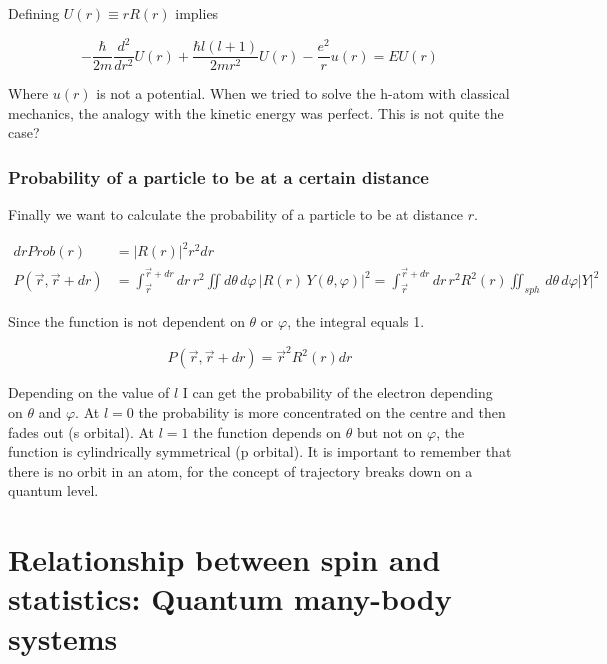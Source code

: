 		Defining $U(r) \equiv rR(r)$ implies

		$$-\frac{\hbar}{2m} \frac{d^2}{dr^2} U(r) + \frac{\hbar l(l+1)}{2mr^2} U(r) - \frac{e^2}{r} u(r) = E U(r)$$

		Where $u(r)$ is not a potential.
		When we tried to solve the h-atom with classical mechanics, the analogy with the kinetic energy was perfect.
		This is not quite the case?

		\subsubsection{Probability of a particle to be at a certain distance}
		Finally we want to calculate the probability of a particle to be at distance $r$.

		\begin{align*}
			drProb(r)&=|R(r)|^2r^2dr\\
			P(\vec{r},\vec{r}+dr)&=\int_{\vec{r}}^{\vec{r}+dr}dr\,r^2\iint d\theta\,d\varphi\,|R(r)\,Y(\theta,\varphi)|^2=\int_{\vec{r}}^{\vec{r}+dr}dr\,r^2R^2(r)\iint_{sph}\,d\theta\,d\varphi|Y|^2
		\end{align*}

		Since the function is not dependent on $\theta$ or $\varphi$, the integral equals 1.

		$$P(\vec{r},\vec{r}+dr)=\vec{r}^2R^2(r)dr$$

		Depending on the value of $l$ I can get the probability of the electron depending on $\theta$ and $\varphi$.
		At $l=0$ the probability is more concentrated on the centre and then fades out (s orbital).
		At $l=1$ the function depends on $\theta$ but not on $\varphi$, the function is cylindrically symmetrical (p orbital).
		It is important to remember that there is no orbit in an atom, for the concept of trajectory breaks down on a quantum level.

\section{Relationship between spin and statistics: Quantum many-body systems}

